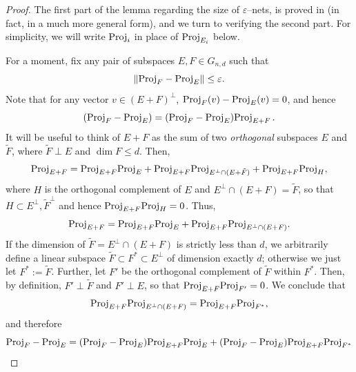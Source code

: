 \documentclass[11pt]{amsart}
\theoremstyle{definition}
\theoremstyle{plain}
\def\Proj{{\rm Proj}}
\begin{document}
\begin{proof}
The first part of the lemma regarding the size of 
$\varepsilon$--nets, is proved in \cite{Szarek81}
(in fact, in a much more general form),
and we turn to verifying the second part.
For simplicity, we will write $\Proj_i$
in place of $\Proj_{E_i}$ below.  

For a moment, fix any pair of subspaces 
$E, F \in G_{n,d}$ such that 
\[
\|\Proj_F - \Proj_E\| \le \varepsilon.
\]
Note that for any vector $v\in (E+F)^\perp$,
$\Proj_F(v) - \Proj_E(v)=0$, and hence
$$
    (\Proj_F - \Proj_E) = (\Proj_F - \Proj_E)\Proj_{E+F}\,.
$$
It will be useful to think of $E+F$ as the sum of two {\it orthogonal}
subspaces $E$ and $\tilde F$, where $\tilde F\perp E$
and $\dim F\leq d$.
Then,
$$
    \Proj_{E+F} = \Proj_{E+F}\Proj_E +
    \Proj_{E+F} \Proj_{E^\perp \cap (E+\tilde F)}
    +\Proj_{E+F}\Proj_H,
$$
where $H$ is the orthogonal complement of $E$ and $E^\perp \cap (E+F)=\tilde F$,
so that $H\subset E^\perp,\tilde F^\perp$ and hence $\Proj_{E+F}\Proj_H=0$.
Thus,
$$
\Proj_{E+F} = \Proj_{E+F}\Proj_E +
\Proj_{E+F} \Proj_{E^\perp \cap (E+F)}.
$$
If the dimension of $\tilde F=E^\perp \cap (E+F)$ is strictly less than $d$,
we arbitrarily define a linear subspace
$\tilde F\subset F^*\subset E^\perp$ of dimension exactly $d$;
otherwise we just let $F^*:=\tilde F$.
Further, let $F'$ be the orthogonal complement of $\tilde F$ within $F^*$.
Then, by definition, $F'\perp \tilde F$ and $F'\perp E$,
so that $\Proj_{E+F}\Proj_{F'}=0$.
We conclude that 
$$
    \Proj_{E+F} \Proj_{E^\perp \cap (E+F)} = \Proj_{E+F} \Proj_{F^*},
$$
and therefore
\begin{equation}\label{eq:ojhbakfjhbasfksdjhbfksdjh}
\Proj_F - \Proj_E = 
(\Proj_F - \Proj_E)\Proj_{E+F}\Proj_E
+(\Proj_F - \Proj_E)\Proj_{E+F} \Proj_{F^*}    
\end{equation}

\medskip


\end{proof}
\end{document}
